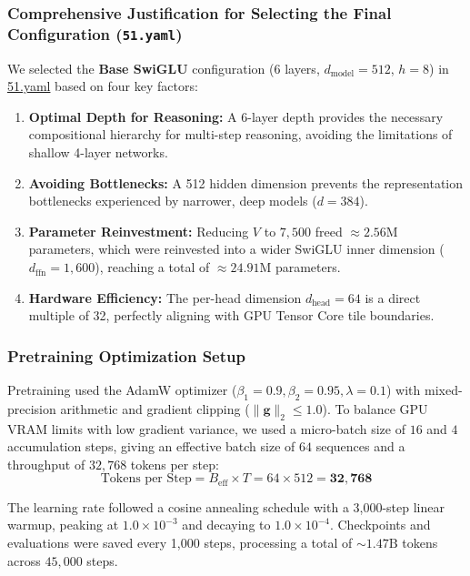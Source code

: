 \documentclass[8pt]{article}
\begin{document}
\subsubsection{Comprehensive Justification for Selecting the Final Configuration (\texttt{51.yaml})}
We selected the \textbf{Base SwiGLU} configuration (6 layers, $d_{\text{model}} = 512$, $h = 8$) in \url{51.yaml} based on four key factors:
\begin{enumerate}
    \item \textbf{Optimal Depth for Reasoning:} A 6-layer depth provides the necessary compositional hierarchy for multi-step reasoning, avoiding the limitations of shallow 4-layer networks.
    \item \textbf{Avoiding Bottlenecks:} A 512 hidden dimension prevents the representation bottlenecks experienced by narrower, deep models ($d = 384$).
    \item \textbf{Parameter Reinvestment:} Reducing $V$ to $7,500$ freed $\approx 2.56\text{M}$ parameters, which were reinvested into a wider SwiGLU inner dimension ($d_{\text{ffn}} = 1,600$), reaching a total of $\approx 24.91\text{M}$ parameters.
    \item \textbf{Hardware Efficiency:} The per-head dimension $d_{\text{head}} = 64$ is a direct multiple of 32, perfectly aligning with GPU Tensor Core tile boundaries.
\end{enumerate}

\subsubsection{Pretraining Optimization Setup}
Pretraining used the AdamW optimizer ($\beta_1 = 0.9, \beta_2 = 0.95, \lambda = 0.1$) with mixed-precision arithmetic and gradient clipping ($\|\mathbf{g}\|_2 \le 1.0$). To balance GPU VRAM limits with low gradient variance, we used a micro-batch size of $16$ and $4$ accumulation steps, giving an effective batch size of $64$ sequences and a throughput of $32,768$ tokens per step:
\begin{equation}
    \text{Tokens per Step} = B_{\text{eff}} \times T = 64 \times 512 = \mathbf{32,768}
\end{equation}

The learning rate followed a cosine annealing schedule with a 3,000-step linear warmup, peaking at $1.0 \times 10^{-3}$ and decaying to $1.0 \times 10^{-4}$. Checkpoints and evaluations were saved every 1,000 steps, processing a total of $\sim 1.47\text{B}$ tokens across $45,000$ steps.
\end{document}
